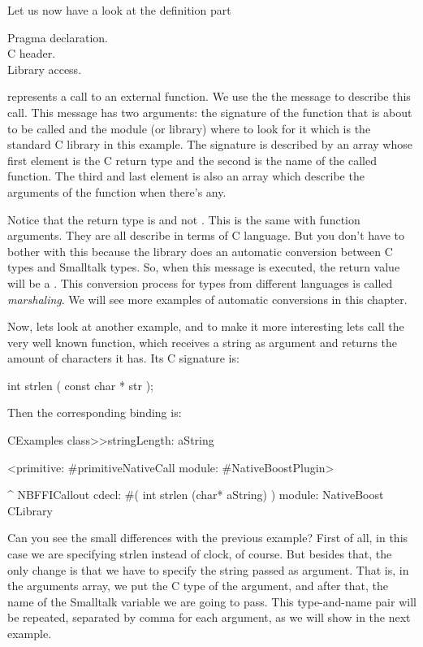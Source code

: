 \documentclass[a4paper,10pt,twoside]{book}
\begin{document}
Let us now have a look at the definition part
\begin{description}
\item [Pragma declaration.]
\item [C header.]
\item [Library access.]
\end{description}


 represents a call to an external function.
We use the the  message  to describe this call. 
This message has two arguments: the signature of the function that is about to be called and the module (or library) where to look for it which is the standard C library in this example. 
The signature is described by an array whose first element is the C return type and the second is the name of the called function.
The third and last element is also an array which describe the arguments of the function when there's any. 

Notice that the return type is  and not . 
This is the same with function arguments. 
They are all describe in terms of C language.
But you don't have to bother with this because the \Spock library does an automatic conversion between C types and Smalltalk types.
So, when this message is executed, the return value will be a . 
This conversion process for types from different languages is called \emph{marshaling}.
We will see more examples of automatic conversions in this chapter. 

Now, lets look at another example, and to make it more interesting lets call the very well known  function, which receives a string as argument and returns the amount of characters it has. 
Its C signature is:

\begin{code}{}
 int strlen ( const char * str );
\end{code}

Then the corresponding binding is:

\begin{code}{}
CExamples class>>stringLength: aString

	<primitive: #primitiveNativeCall module: #NativeBoostPlugin>
	
	^ NBFFICallout cdecl: #( int strlen (char* aString) ) module: NativeBoost CLibrary
\end{code}

Can you see the small differences with the previous example? 
First of all, in this case we are specifying strlen
instead of clock, of course. But besides that, the only
change is that we have to specify the string passed
as argument. That is, in the arguments array, we
put the C type of the argument, and after that,
the name of the Smalltalk variable we are going to pass.
This type-and-name pair will be repeated, separated by
comma for each argument, as we will show in the next
example. 
\end{document}

